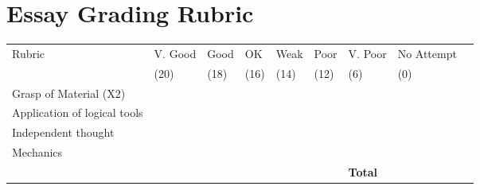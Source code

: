\documentclass{article}[12pt]
\begin{document}
\thispagestyle{fancy}

\section*{Essay Grading Rubric}
\begin{center}


\resizebox{19cm}{!} {
    \begin{tabular}{ | l | l | l | l | l | l | l | l | l |    }
    \hline
    Rubric &  V. Good & Good & OK & Weak & Poor & V. Poor & No Attempt \\  
	 & (20) & (18) & (16) & (14) & (12) & (6)  & (0) \\    \hline
    Grasp of Material (X2) & & & & & & &\\ \hline   
    Application of logical tools &  & & & & & &\\ \hline
	Independent thought &  & & & & & &\\ \hline
 Mechanics & & & & & &  &\\ \hline \hline
 & &  & & &  & \textbf{Total}  & \\ \hline
    \end{tabular}
}


\end{center}
\end{document}
